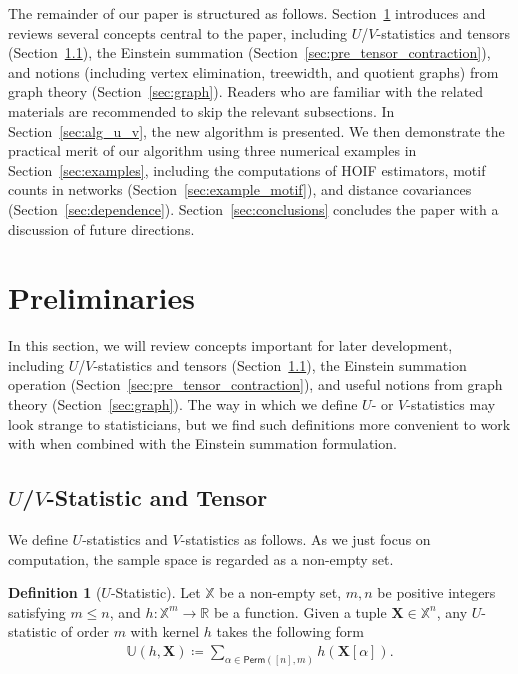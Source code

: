 \documentclass[sn-mathphys, natbib=false]{sn-jnl}
\newcommand{\pdfu}{\texorpdfstring{$U$}{U}}
\newcommand{\pdfv}{\texorpdfstring{$V$}{V}}
\theoremstyle{plain}
\theoremstyle{definition}
\newtheorem{definition}{Definition}
\newcommand{\ustat}{\mathbb{U}}
\newcommand{\ustatp}[2]{\ustat(#1,#2)}
\newcommand{\perm}[1]{\mathsf{Perm}(#1)}
\newcommand{\degp}[2]{\deg(#1,#2)}
\newcommand{\bbR}{{\mathbb{R}}}
\def\bbX{\mathbb{X}}
\begin{document}
\begin{bibunit}[agsm]

The remainder of our paper is structured as follows. Section~\ref{sec:preliminaries} introduces and reviews several concepts central to the paper, including $U$/$V$-statistics and tensors (Section~\ref{sec:pre_u_v}), the Einstein summation (Section~\ref{sec:pre_tensor_contraction}), and notions (including vertex elimination, treewidth, and quotient graphs) from graph theory (Section~\ref{sec:graph}). Readers who are familiar with the related materials are recommended to skip the relevant subsections. In Section~\ref{sec:alg_u_v}, the new algorithm is presented. We then demonstrate the practical merit of our algorithm using three numerical examples in Section~\ref{sec:examples}, including the computations of HOIF estimators, motif counts in networks (Section~\ref{sec:example_motif}), and distance covariances (Section~\ref{sec:dependence}). Section~\ref{sec:conclusions} concludes the paper with a discussion of future directions.

\section{Preliminaries}
\label{sec:preliminaries}

In this section, we will review concepts important for later development, including $U$/$V$-statistics and tensors (Section~\ref{sec:pre_u_v}), the Einstein summation operation (Section~\ref{sec:pre_tensor_contraction}), and useful notions from graph theory (Section~\ref{sec:graph}). The way in which we define $U$- or $V$-statistics may look strange to statisticians, but we find such definitions more convenient to work with when combined with the Einstein summation formulation.

\subsection{\pdfu/\pdfv-Statistic and Tensor}\label{sec:pre_u_v}

We define $U$-statistics and $V$-statistics as follows. As we just focus on computation, the sample space is regarded as a non-empty set. 

\begin{definition}[$U$-Statistic]\label{def:u_stat}
Let $\bbX$ be a non-empty set, $m, n$ be positive integers satisfying $m \leq n$, and $h: \bbX^{m} \rightarrow \bbR$ be a function. Given a tuple $\bm{X} \in \bbX^n$, any $U$-statistic of order $m$ with kernel $h$ takes the following form 
    \begin{align*}
        \ustatp{h}{\bm{X}} \coloneqq \sum_{\alpha \in \perm{[n],m}} h(\bm{X}[\alpha]). 
    \end{align*}
\end{definition}


\end{bibunit}
\end{document}

